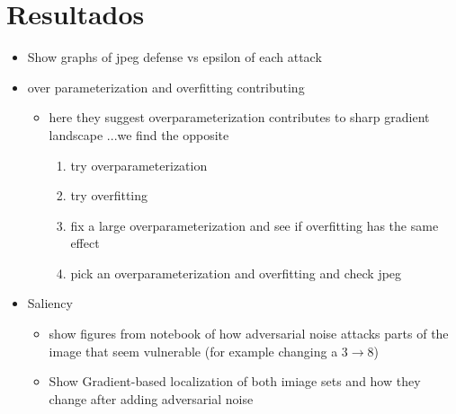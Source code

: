\section{Resultados}
\begin{itemize}
    \item Show graphs of jpeg defense vs epsilon of each attack 
    \item over parameterization and overfitting contributing
    \begin{itemize}
        \item here they suggest overparameterization contributes to sharp gradient landscape \cite{ma2020understanding}...we find the opposite
        \begin{enumerate}
            \item try overparameterization
            \item try overfitting 
            \item fix a large overparameterization and see if overfitting has the same effect
            \item pick an overparameterization and overfitting and check jpeg
        \end{enumerate}
    \end{itemize}
    \item Saliency
    \begin{itemize}
        \item show figures from notebook of how adversarial noise attacks parts of the image that seem vulnerable (for example changing a 3$\to$8)
        \item Show Gradient-based localization of both imiage sets and how they change after adding adversarial noise\cite{Selvaraju_2019}
    \end{itemize}
\end{itemize}